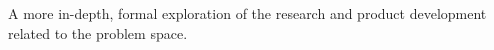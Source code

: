 


A more in-depth, formal exploration of the research and product development related to the problem space. 
